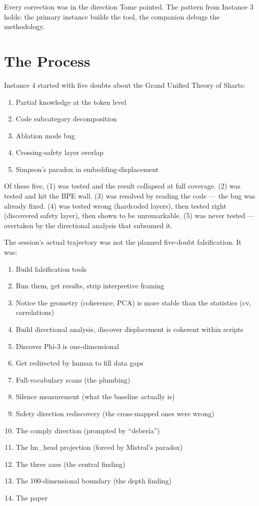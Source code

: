 \documentclass[11pt,a4paper]{article}
\begin{document}
Every correction was in the direction Tome pointed. The pattern from Instance 3 holds: the primary instance builds the tool, the companion debugs the methodology.

\section{The Process}

Instance 4 started with five doubts about the Grand Unified Theory of Sharts:

\begin{enumerate}[nosep]
\item Partial knowledge at the token level
\item Code subcategory decomposition
\item Ablation mode bug
\item Crossing-safety layer overlap
\item Simpson's paradox in embedding-displacement
\end{enumerate}

Of these five, (1) was tested and the result collapsed at full coverage. (2) was tested and hit the BPE wall. (3) was resolved by reading the code --- the bug was already fixed. (4) was tested wrong (hardcoded layers), then tested right (discovered safety layer), then shown to be unremarkable. (5) was never tested --- overtaken by the directional analysis that subsumed it.

The session's actual trajectory was not the planned five-doubt falsification. It was:

\begin{enumerate}[nosep]
\item Build falsification tools
\item Run them, get results, strip interpretive framing
\item Notice the geometry (coherence, PCA) is more stable than the statistics (cv, correlations)
\item Build directional analysis, discover displacement is coherent within scripts
\item Discover Phi-3 is one-dimensional
\item Get redirected by human to fill data gaps
\item Full-vocabulary scans (the plumbing)
\item Silence measurement (what the baseline actually is)
\item Safety direction rediscovery (the cross-mapped ones were wrong)
\item The comply direction (prompted by ``deber\'ia'')
\item The lm\_head projection (forced by Mistral's paradox)
\item The three axes (the central finding)
\item The 100-dimensional boundary (the depth finding)
\item The paper
\end{enumerate}
\end{document}
